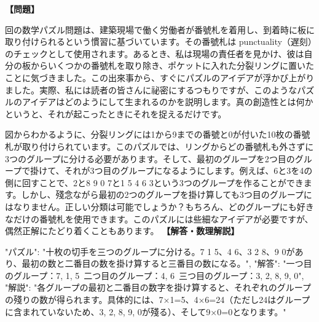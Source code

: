 \documentclass[10pt,a4paper,oneside,openany]{ltjsbook}
\begin{document}
\begin{tcolorbox}[colback=softblue,colframe=primaryblue,title=\textbf{第 87 問：THE NUMBER-CHECKS PUZZLE.},arc=2mm,boxrule=1pt,breakable]
\textbf{【問題】}\par\vspace{0.3em}
回の数学パズル問題は、建築現場で働く労働者が番號札を着用し、到着時に板に取り付けられるという慣習に基づいています。その番號札は punctuality（遅刻）のチェックとして使用されます。あるとき、私は現場の責任者を見かけ、彼は自分の板からいくつかの番號札を取り除き、ポケットに入れた分裂リングに置いたことに気づきました。この出來事から、すぐにパズルのアイデアが浮かび上がりました。実際、私には読者の皆さんに祕密にするつもりですが、このようなパズルのアイデアはどのようにして生まれるのかを説明します。真の創造性とは何かというと、それが起こったときにそれを捉えるだけです。

図からわかるように、分裂リングには1から9までの番號と0が付いた10枚の番號札が取り付けられています。このパズルでは、リングからどの番號札も外さずに3つのグループに分ける必要があります。そして、最初のグループを2つ目のグループで掛けて、それが3つ目のグループになるようにします。例えば、6と3を4の側に回すことで、2と8 9 0 7と1 5 4 6 3という3つのグループを作ることができます。しかし、殘念ながら最初の2つのグループを掛け算しても3つ目のグループにはなりません。正しい分類は可能でしょうか？もちろん、どのグループにも好きなだけの番號札を使用できます。このパズルには些細なアイデアが必要ですが、偶然正解にたどり着くこともあります。
\tcblower
\textbf{【解答・数理解説】}\par\vspace{0.3em}
{
"パズル": "十枚の切手を三つのグループに分ける。7 1 5、4 6、3 2 8、9 0があり、最初の数と二番目の数を掛け算すると三番目の数になる。",
"解答": "一つ目のグループ：7, 1, 5\
二つ目のグループ：4, 6\
三つ目のグループ：3, 2, 8, 9, 0",
"解説": "各グループの最初と二番目の数字を掛け算すると、それぞれのグループの殘りの数が得られます。具体的には、7×1=5、4×6=24（ただし24はグループに含まれていないため、3, 2, 8, 9, 0が殘る）、そして9×0=0となります。"
}
\end{tcolorbox}
\end{document}
